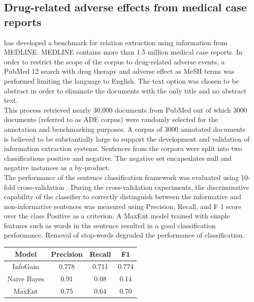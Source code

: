 \documentclass[12pt]{article} %
\begin{document}
\subsection{Drug-related adverse effects from medical case reports}

\cite{gurulingappa2012development} has developed a benchmark for relation extraction using information from MEDLINE. MEDLINE contains more than 1.5 million medical case reports. In order to restrict the scope of the corpus to drug-related adverse events, a PubMed 12 search with drug therapy and adverse effect as MeSH \cite{lowe1994understanding} terms was performed limiting the language to English. The text option was chosen to be abstract in order to eliminate the documents with the only title and no abstract text.\\

This process retrieved nearly 30,000 documents from PubMed out of which 3000 documents (referred to as ADE corpus) were randomly selected for the annotation and benchmarking purposes. A corpus of 3000 annotated documents is believed to be substantially large to support the development and validation of information extraction systems. Sentences from the corpora were split into two classifications positive and negative. The negative set encapsulates null and negative instances as a by-product.\\

The performance of the sentence classification framework was evaluated using 10-fold cross-validation \cite{kohavi1995study}. During the cross-validation experiments, the discriminative capability of the classifier to correctly distinguish between the informative and non-informative sentences was measured using Precision, Recall, and F 1 score over the class Positive as a criterion. A MaxEnt model trained with simple features such as words in the sentence resulted in a good classification performance. Removal of stop-words degraded the performance of classification.

\begin{center}
 \begin{tabular}{||c c c c||} 
 \hline
 Model & Precision & Recall & F1 \\ [0.5ex] 
 \hline\hline
 InfoGain & 0.778 & 0.711 & 0.774 \\ 
 \hline
 Naive Bayes & 0.91 & 0.08 & 0.14 \\
 \hline
 MaxEnt & 0.75 & 0.64 & 0.70 \\
 \hline
\end{tabular}
\end{center}
\end{document}
